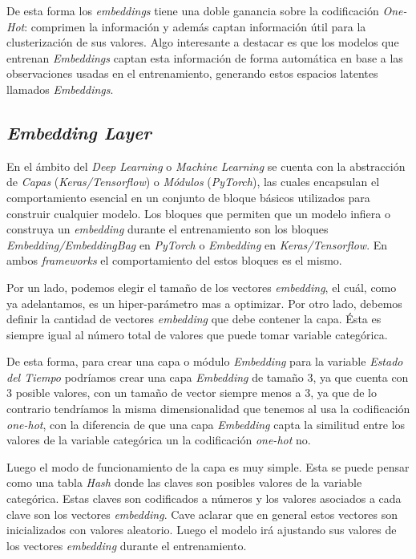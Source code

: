 \documentclass[11pt,a4paper,twoside]{thesis}
\begin{document}
De esta forma los \textit{embeddings} tiene una doble ganancia sobre la
codificación \textit{One-Hot}: comprimen la información y además captan
información útil para la clusterización de sus valores. Algo interesante a
destacar es que los modelos que entrenan \textit{Embeddings} captan esta
información de forma automática en base a las observaciones usadas en el
entrenamiento, generando estos espacios latentes llamados \textit{Embeddings}.

\subsection{\textit{Embedding Layer}}

En el ámbito del \textit{Deep Learning} o \textit{Machine Learning} se cuenta
con la abstracción de \textit{Capas} (\textit{Keras/Tensorflow}) o
\textit{Módulos} (\textit{PyTorch}), las cuales encapsulan el comportamiento
esencial en un conjunto de bloque básicos utilizados para construir cualquier
modelo. Los bloques que permiten que un modelo infiera o construya un
\textit{embedding} durante el entrenamiento son los bloques
\textit{Embedding/EmbeddingBag} en \textit{PyTorch} o \textit{Embedding} en
\textit{Keras/Tensorflow}. En ambos \textit{frameworks} el comportamiento del
estos bloques es el mismo.

Por un lado, podemos elegir el tamaño de los vectores \textit{embedding}, el
cuál, como ya adelantamos, es un hiper-parámetro mas a optimizar. Por otro
lado, debemos definir la cantidad de vectores \textit{embedding} que debe
contener la capa. Ésta es siempre igual al número total de valores que puede
tomar variable categórica.

De esta forma, para crear una capa o módulo \textit{Embedding} para la variable
\textit{Estado del Tiempo} podríamos crear una capa \textit{Embedding} de
tamaño 3, ya que cuenta con 3 posible valores, con un tamaño de vector siempre
menos a 3, ya que de lo contrario tendríamos la misma dimensionalidad que
tenemos al usa la codificación \textit{one-hot}, con la diferencia de que una
capa \textit{Embedding} capta la similitud entre los valores de la variable
categórica un la codificación \textit{one-hot} no.

Luego el modo de funcionamiento de la capa es muy simple. Esta se puede pensar
como una tabla \textit{Hash} donde las claves son posibles valores de la
variable categórica. Estas claves son codificados a números y los valores
asociados a cada clave son los vectores \textit{embedding}. Cave aclarar que en
general estos vectores son inicializados con valores aleatorio. Luego el modelo
irá ajustando sus valores de los vectores \textit{embedding} durante el
entrenamiento.
\end{document}
